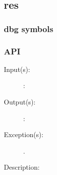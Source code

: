 %
%
%
%
%              

\subsection{res}
\label{res}

\subsubsection{dbg symbols}

\subsubsection{API}
\begin{description}
\label{res_}
\item[{\cfunc[]{res\_}{}}: ]
	\begin{description}\item[]
	\item[Input(s): ]
		\begin{description}\item[]
		\item[: ]
		\end{description}
	\item[Output(s): ]
		\begin{description}\item[]
		\item[: ]
		\end{description}
	\item[Exception(s): ]
		\begin{description}\item[]
		\item[.]
		\end{description}
	\item[Description: ]
	\end{description}
\end{description}
